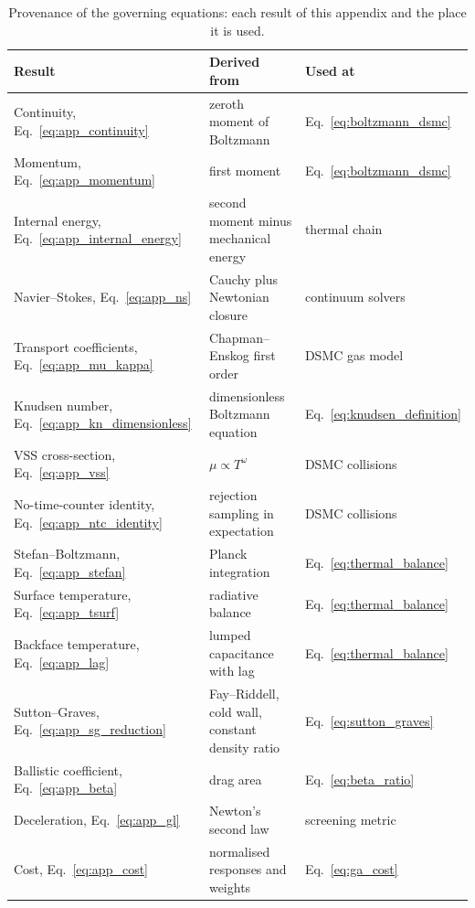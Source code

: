 \begin{table}[H]
\centering
\caption{Provenance of the governing equations: each result of this appendix and the place it is used.}
\label{tab:app_results}
\begin{tabularx}{\textwidth}{@{}>{\RaggedRight\arraybackslash}p{} >{\RaggedRight\arraybackslash}X >{\RaggedRight\arraybackslash}p{}@{}}
\toprule
\textbf{Result} & \textbf{Derived from} & \textbf{Used at} \\
\midrule
Continuity, Eq.~\eqref{eq:app_continuity} & zeroth moment of Boltzmann & Eq.~\eqref{eq:boltzmann_dsmc} \\
Momentum, Eq.~\eqref{eq:app_momentum} & first moment & Eq.~\eqref{eq:boltzmann_dsmc} \\
Internal energy, Eq.~\eqref{eq:app_internal_energy} & second moment minus mechanical energy & thermal chain \\
Navier--Stokes, Eq.~\eqref{eq:app_ns} & Cauchy plus Newtonian closure & continuum solvers \\
Transport coefficients, Eq.~\eqref{eq:app_mu_kappa} & Chapman--Enskog first order & DSMC gas model \\
Knudsen number, Eq.~\eqref{eq:app_kn_dimensionless} & dimensionless Boltzmann equation & Eq.~\eqref{eq:knudsen_definition} \\
VSS cross-section, Eq.~\eqref{eq:app_vss} & $\mu\propto T^{\omega}$ & DSMC collisions \\
No-time-counter identity, Eq.~\eqref{eq:app_ntc_identity} & rejection sampling in expectation & DSMC collisions \\
Stefan--Boltzmann, Eq.~\eqref{eq:app_stefan} & Planck integration & Eq.~\eqref{eq:thermal_balance} \\
Surface temperature, Eq.~\eqref{eq:app_tsurf} & radiative balance & Eq.~\eqref{eq:thermal_balance} \\
Backface temperature, Eq.~\eqref{eq:app_lag} & lumped capacitance with lag & Eq.~\eqref{eq:thermal_balance} \\
Sutton--Graves, Eq.~\eqref{eq:app_sg_reduction} & Fay--Riddell, cold wall, constant density ratio & Eq.~\eqref{eq:sutton_graves} \\
Ballistic coefficient, Eq.~\eqref{eq:app_beta} & drag area & Eq.~\eqref{eq:beta_ratio} \\
Deceleration, Eq.~\eqref{eq:app_gl} & Newton's second law & screening metric \\
Cost, Eq.~\eqref{eq:app_cost} & normalised responses and weights & Eq.~\eqref{eq:ga_cost} \\
\bottomrule
\end{tabularx}
\end{table}

